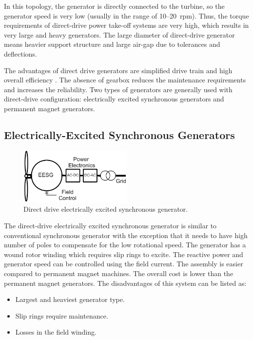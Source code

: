 \documentclass[a4paper, 11pt]{article} %
\begin{document}
In this topology, the generator is directly connected to the turbine, so the generator speed is very low (usually in the range of 10--20~rpm). Thus, the torque requirements of direct-drive power take-off systems are very high, which results in very large and heavy generators. The large diameter of direct-drive generator means heavier support structure and large air-gap due to tolerances and deflections.

The advantages of direct drive generators are simplified drive train and high overall efficiency \cite{Li2008a}. The absence of gearbox reduces the maintenance requirements and increases the reliability. Two types of generators are generally used with direct-drive configuration: electrically excited synchronous generators and permanent magnet generators. 

\subsection{Electrically-Excited Synchronous Generators}

  \begin{figure}
    \centering
    \includegraphics[width=0.5\textwidth]{EESG}
    \caption{Direct drive electrically excited synchronous generator.} 
    \label{eesg}
  \end{figure}

The direct-drive electrically excited synchronous generator is similar to conventional synchronous generator with the exception that it needs to have high number of poles to compensate for the low rotational speed. The generator has a wound rotor winding which requires slip rings to excite. The reactive power and generator speed can be controlled using the field current. The assembly is easier compared to permanent magnet machines. The overall cost is lower than the permanent magnet generators. The disadvantages of this system can be listed as:

\begin{itemize}
	\item Largest and heaviest generator type.
	\item Slip rings require maintenance.
	\item Losses in the field winding.
\end{itemize}
\end{document}
